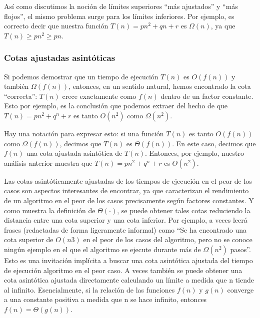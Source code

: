 \documentclass[a4paper, 12pt]{book}
\begin{document}
Así como discutimos la noción de límites superiores ``más ajustados'' y ``más flojos'', el mismo problema surge para los límites inferiores. Por ejemplo, es correcto decir que nuestra función $T(n) = pn^2 + qn + r$ es $\Omega(n)$, ya que $T(n) \geq pn^2 \geq pn$.

\subsubsection*{Cotas ajustadas asintóticas}

Si podemos demostrar que un tiempo de ejecución $T(n)$ es $O(f(n))$ y también $\Omega(f(n))$, entonces, en un sentido natural, hemos encontrado la cota ``correcta'': $T(n)$ crece exactamente como $f(n)$ dentro de un factor constante. Esto por ejemplo, es la conclusión que podemos extraer del hecho de que $T(n) = pn^2 + q^n + r$ es tanto $O(n^2)$ como $\Omega(n^2)$.

Hay una notación para expresar esto: si una función $T(n)$ es tanto $O(f(n))$ como $\Omega(f (n))$, decimos que $T(n)$ es $\Theta(f(n))$. En este caso, decimos que $f(n)$ una cota ajustada asintótica de $T(n)$. Entonces, por ejemplo, nuestro análisis anterior muestra que $T (n) = pn^2 + q^n + r$ es $\Theta(n^2)$.

Las cotas asintóticamente ajustadas de los tiempos de ejecución en el peor de los casos son aspectos interesantes de encontrar, ya que caracterizan el rendimiento de un algoritmo en el peor de los casos precisamente según factores constantes.
Y como muestra la definición de $\Theta(\cdot)$, se puede obtener tales cotas reduciendo la distancia entre una cota superior y una cota inferior.  Por ejemplo, a veces leerá frases (redactadas de forma ligeramente informal) como ``Se ha encontrado una cota superior de $O(n3)$ en el peor de los casos del algoritmo, pero no se conoce ningún ejemplo en el que el algoritmo se ejecute durante más de $\Omega(n^2)$ pasos''. Esto es una invitación implícita a buscar una cota asintótica ajustada del tiempo de ejecución algoritmo en el peor caso. 
A veces también se puede obtener una cota asintótica ajustada directamente calculando un límite a medida que n tiende al infinito. Esencialmente, si la relación de las funciones $f(n)$ y $g(n)$ converge a una constante positiva a medida que n se hace infinito, entonces $f(n) = \Theta(g(n))$.
\end{document}
